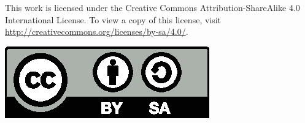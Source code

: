\vspace*{\fill}


\begin{minipage}{0.7\textwidth}
    This work is licensed under the Creative Commons Attribution-ShareAlike 4.0 International License.
    To view a copy of this license, visit \url{http://creativecommons.org/licenses/by-sa/4.0/}.
\end{minipage}
\hfill
\begin{minipage}{0.25\textwidth}
    \includegraphics[width=\textwidth]{resources/by-sa.eps}
\end{minipage}

\pagebreak

